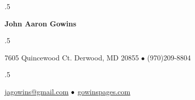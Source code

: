 \documentclass[margin,10pt]{res} %
\begin{document}
\vspace*{-2cm}

\moveleft.5\hoffset\centerline{\Large\bf John Aaron Gowins }  
\smallskip
\moveleft.5\hoffset\centerline{7605 Quincewood Ct. Derwood, MD 20855 $\bullet$ (970)209-8804} %
\smallskip
\moveleft.5\hoffset\centerline{\color{blue} \href{mailto:jagowins@gmail.com}{jagowins@gmail.com} 
$\color{black}\bullet$ \href{http://gowinspages.com}{gowinspages.com}  
 }
\end{document}
